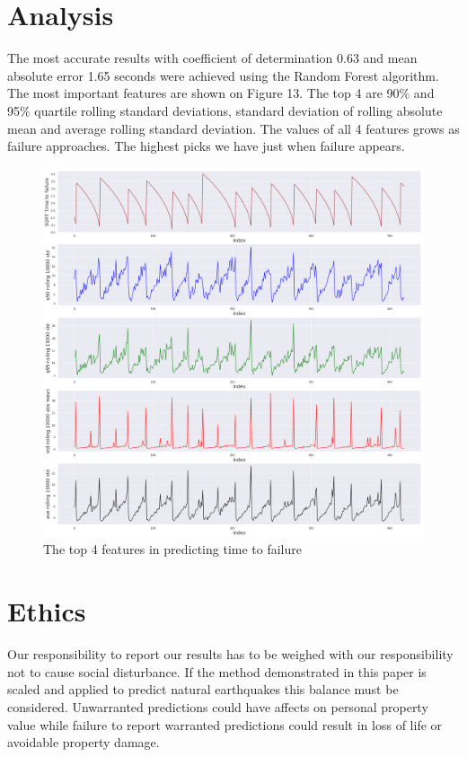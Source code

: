 \documentclass[]{llncs} %
\begin{document}
\section{Analysis}
The most accurate results with coefficient of determination 0.63 and mean absolute error 1.65 seconds were achieved using the Random Forest algorithm. The most important features are shown on Figure 13. The top 4 are 90\% and 95\% quartile rolling standard deviations, standard deviation of rolling absolute mean and average rolling standard deviation.
The values of all 4 features grows as failure approaches. The highest picks we have just when failure appears.
\begin{figure}[H]
	\centering
	\includegraphics[width=1\linewidth]{analysis}
	\caption{The top 4 features in predicting time to failure}
	\label{fig:analysis}
\end{figure}

\clearpage
\newpage

\section{Ethics}

Our responsibility to report our results has to be weighed with our responsibility not to cause social disturbance. If the method demonstrated in this paper is scaled and applied to predict natural earthquakes this balance must be considered. Unwarranted predictions could have affects on personal property value while failure to report warranted predictions could result in loss of life or avoidable property damage. \par
\end{document}
